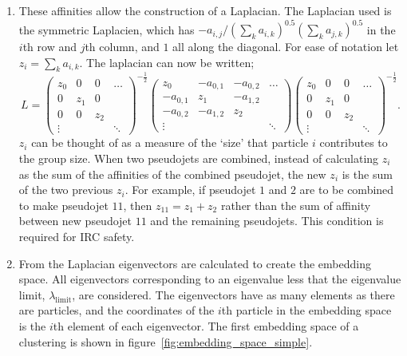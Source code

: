 \begin{enumerate}
\item\label{step:laplacean} These affinities allow the construction of a Laplacian.
        The Laplacian used is the symmetric Laplacien, which has \(-a_{i,j}/(\sum_k a_{i,k})^{0.5}(\sum_k a_{j,k})^{0.5}\)
        in the \(i\)th row and \(j\)th column, and \(1\) all along the diagonal.
        For ease of notation let \(z_i = \sum_k a_{i,k}\).
        The laplacian can now be written;
    \begin{equation}\label{eqn:laplacian}
        L = 
        \begin{pmatrix}
            z_0      & 0   & 0  & \hdots \\
               0     & z_1 &    0     & \\
               0     &    0     & z_2 & \\
            \vdots   &          &     & \ddots 
        \end{pmatrix}^{-\frac{1}{2}}
        \begin{pmatrix}
            z_0 & -a_{0,1} & -a_{0,2} & \hdots \\
            -a_{0,1} & z_1 & -a_{1,2} & \\
            -a_{0,2} & -a_{1,2} & z_2 & \\
            \vdots   &          &     & \ddots 
        \end{pmatrix}
        \begin{pmatrix}
            z_0 &    0     &    0     & \hdots \\
               0     & z_1 &    0     & \\
               0     &    0     & z_2 & \\
            \vdots   &          &     & \ddots 
        \end{pmatrix}^{-\frac{1}{2}}.
    \end{equation}
        \(z_i\) can be thought of as a measure of the `size' that particle \(i\) contributes to the group size.
        When two pseudojets are combined, instead of calculating \(z_i\) as the sum of the affinities of the combined pseudojet,
        the new \(z_i\) is the sum of the two previous \(z_i\).
        For example, if pseudojet \(1\) and \(2\) are to be combined to make pseudojet \(11\),
        then \(z_{11} = z_1 + z_2\) rather than the sum of affinity between new pseudojet \(11\) and the remaining pseudojets.
        This condition is required for IRC safety.

\item \label{step:eigenvectors} From the Laplacian eigenvectors are calculated to create the embedding space.
            All eigenvectors corresponding to an eigenvalue less that the eigenvalue limit, \(\lambda_\text{limit}\), are considered.
        The eigenvectors have as many elements as there are particles, and the coordinates of
        the \(i\)th particle in the embedding space is the \(i\)th element of each eigenvector.
        The first embedding space of a clustering is shown in figure~\ref{fig:embedding_space_simple}.


\end{enumerate}
